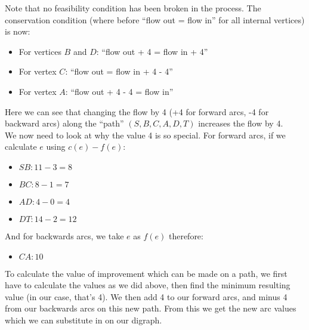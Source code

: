Note that no feasibility condition has been broken in the process. The conservation condition (where before ``flow out = flow in'' for all internal vertices) is now:
\begin{itemize}
    \item For vertices $B$ and $D$: ``flow out + 4 = flow in + 4''
    \item For vertex $C$: ``flow out = flow in + 4 - 4''
    \item For vertex $A$: ``flow out + 4 - 4 = flow in''
\end{itemize}
Here we can see that changing the flow by 4 (+4 for forward arcs, -4 for backward arcs) along the ``path'' $(S, B, C, A, D, T)$ increases the flow by 4. \\

We now need to look at why the value 4 is so special. For forward arcs, if we calculate $e$ using $c(e) - f(e)$:
\begin{itemize}
    \item $SB: 11-3=8$
    \item $BC: 8-1=7$
    \item $AD: 4-0=4$
    \item $DT: 14-2=12$
\end{itemize}
And for backwards arcs, we take $e$ as $f(e)$ therefore:
\begin{itemize}
    \item $CA: 10$
\end{itemize}

To calculate the value of improvement which can be made on a path, we first have to calculate the values as we did above, then find the minimum resulting value (in our case, that's 4). We then add 4 to our forward arcs, and minus 4 from our backwards arcs on this new path. From this we get the new arc values which we can substitute in on our digraph.

